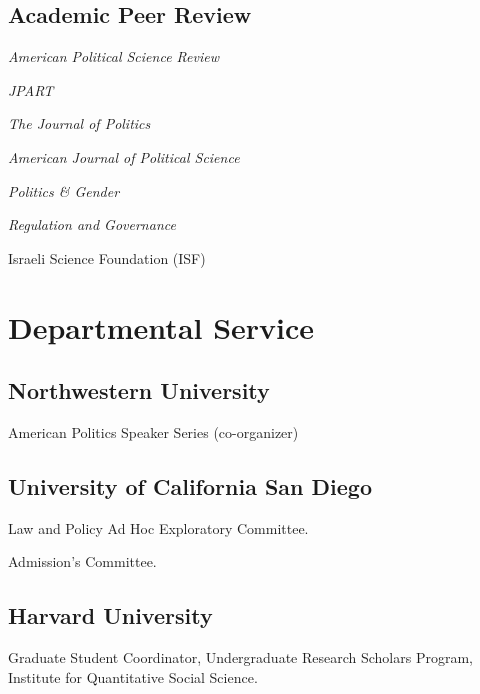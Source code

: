 \documentclass[12pt,letterpaper]{report}
\newcommand{\listitemspace}{0.25em}
\renewenvironment{itemize}
{\begin{list}{}{\setlength{\leftmargin}{0em}
                \setlength{\parskip}{0em}
                \setlength{\itemsep}{\listitemspace}
                \setlength{\parsep}{\listitemspace}}}
{\end{list}}
\begin{document}
    \subsection*{Academic Peer Review}
    
    \begin{itemize}
        \item[] \emph{American Political Science Review}
        \item[] \emph{JPART}
        \item[] \emph{The Journal of Politics}
        \item[] \emph{American Journal of Political Science}
        \item[] \emph{Politics \& Gender}
        \item[] \emph{Regulation and Governance}
        \item[] Israeli Science Foundation (ISF)
    \end{itemize}
	    
    \section*{Departmental Service}
    \subsection*{Northwestern University}
    \begin{tablist}
        \item[2022-] \tab{}American Politics Speaker Series (co-organizer)
    \end{tablist}
    \subsection*{University of California San Diego}
    \begin{tablist}
        \item[2021-] \tab{}Law and Policy Ad Hoc Exploratory Committee.
        \item[2020-] \tab{}Admission's Committee.
    \end{tablist}
    
    \subsection*{Harvard University}
    \begin{tablist}
        \item[2015-17] \tab{}Graduate Student Coordinator, Undergraduate Research Scholars Program, Institute for Quantitative Social Science.
    \end{tablist}
    
\end{document}
